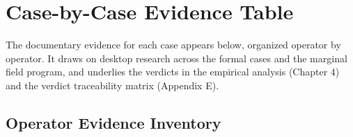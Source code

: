 \hypertarget{case-by-case-evidence-table}{%
\chapter{Case-by-Case Evidence
Table}\label{case-by-case-evidence-table}}

The documentary evidence for each case appears below, organized operator
by operator. It draws on desktop research across the formal cases and
the marginal field program, and underlies the verdicts in the empirical
analysis (Chapter 4) and the verdict traceability matrix (Appendix E).

\begin{landscape}
\hypertarget{operator-evidence-inventory}{%
\section{Operator Evidence
Inventory}\label{operator-evidence-inventory}}


\end{landscape}
